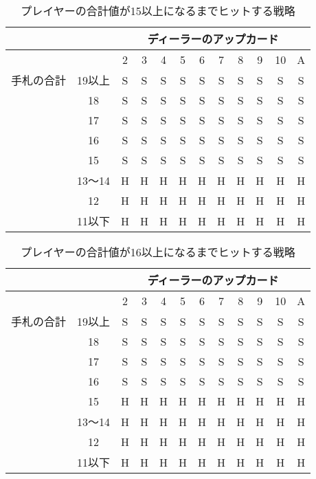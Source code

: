 \begin{table}[H]
  \centering
  \caption{プレイヤーの合計値が15以上になるまでヒットする戦略\label{hitleq15}}
  \begin{tabular}{|c|c|c|c|c|c|c|c|c|c|c|c|}
    \hline
    \multicolumn{2}{|c|}{} & \multicolumn{10}{|c|}{ディーラーのアップカード} \\ \hline
    \multicolumn{2}{|c|}{} & 2 & 3 & 4 & 5 & 6 & 7 & 8 & 9 & 10 & A \\ \hline
    手札の合計 & 19以上 & S & S & S & S & S & S & S & S & S & S \\ \cline{3-12}
              & 18 & S & S & S & S & S & S & S & S & S & S \\ \cline{3-12}
              & 17 & S & S & S & S & S & S & S & S & S & S \\ \cline{3-12}
              & 16 & S & S & S & S & S & S & S & S & S & S \\ \cline{3-12}
              & 15 & S & S & S & S & S & S & S & S & S & S \\ \cline{3-12}
              & 13～14 & H & H & H & H & H & H & H & H & H & H \\ \cline{3-12}
              & 12 & H & H & H & H & H & H & H & H & H & H \\ \cline{3-12}
              & 11以下 & H & H & H & H & H & H & H & H & H & H \\ \hline
  \end{tabular}
\end{table}

\begin{table}[H]
  \centering
  \caption{プレイヤーの合計値が16以上になるまでヒットする戦略\label{hitleq16}}
  \begin{tabular}{|c|c|c|c|c|c|c|c|c|c|c|c|}
    \hline
    \multicolumn{2}{|c|}{} & \multicolumn{10}{|c|}{ディーラーのアップカード} \\ \hline
    \multicolumn{2}{|c|}{} & 2 & 3 & 4 & 5 & 6 & 7 & 8 & 9 & 10 & A \\ \hline
    手札の合計 & 19以上 & S & S & S & S & S & S & S & S & S & S \\ \cline{3-12}
              & 18 & S & S & S & S & S & S & S & S & S & S \\ \cline{3-12}
              & 17 & S & S & S & S & S & S & S & S & S & S \\ \cline{3-12}
              & 16 & S & S & S & S & S & S & S & S & S & S \\ \cline{3-12}
              & 15 & H & H & H & H & H & H & H & H & H & H \\ \cline{3-12}
              & 13～14 & H & H & H & H & H & H & H & H & H & H \\ \cline{3-12}
              & 12 & H & H & H & H & H & H & H & H & H & H \\ \cline{3-12}
              & 11以下 & H & H & H & H & H & H & H & H & H & H \\ \hline
  \end{tabular}
\end{table}

